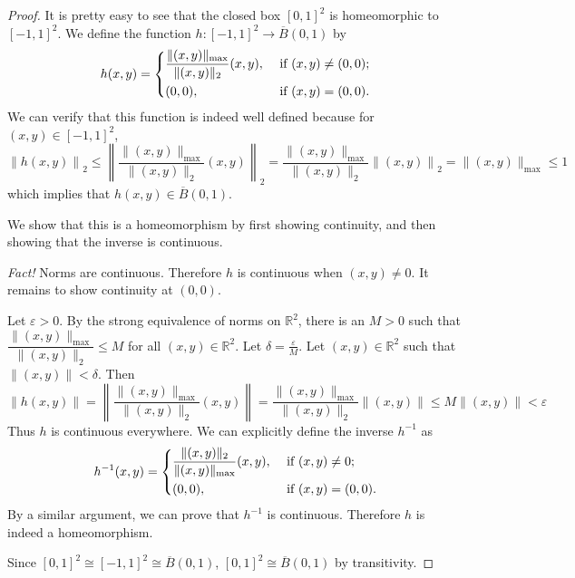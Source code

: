 \documentclass{article}
\newcommand{\cl}[1]{\overline{#1}}
\theoremstyle{plain} %
\numberwithin{thm}{section} %
\theoremstyle{definition}
\begin{document}
    \begin{proof}
        It is pretty easy to see that the closed box \([0,1]^2\) is homeomorphic to \([-1,1]^2\). We define the function \(h:[-1,1]^2 \to \cl{B}(0,1)\) by
        \[
            h(x,y)=\begin{dcases}
                \frac{\|(x,y)\| _{\max}}{\|(x,y)\| _2}(x, y), &\text{ if } (x,y) \neq (0,0) ;\\
                (0,0), &\text{ if } (x,y)=(0,0).
            \end{dcases}
        \]
        We can verify that this function is indeed well defined because for \((x,y) \in [-1,1]^2\),
        \[
            \left\lVert h(x,y) \right\rVert _2 \leq \left\lVert \frac{\|(x,y)\| _{\max}}{\|(x,y)\| _2}(x, y) \right\rVert _2 = \frac{\|(x,y)\| _{\max}}{\|(x,y)\| _2} \left\lVert (x,y) \right\rVert _2 = \|(x,y)\| _{\max} \leq 1
        \]
        which implies that \(h(x,y) \in \cl{B}(0,1)\).

        We show that this is a homeomorphism by first showing continuity, and then showing that the inverse is continuous.

        \textit{Fact!} Norms are continuous. Therefore \(h\) is continuous when \((x,y) \neq 0\). It remains to show continuity at \((0,0)\).

        Let \(\varepsilon > 0\). By the strong equivalence of norms on \(\mathbb{R}^2\), there is an \(M >0\) such that \(\dfrac{\|(x,y)\| _{\max}}{\|(x,y)\| _2} \leq M\) for all \((x,y) \in \mathbb{R}^2\). Let \(\delta = \frac{\varepsilon}{M}\). Let \((x,y) \in \mathbb{R}^2\) such that \(\|(x,y)\| < \delta\).
        Then
        \[
            \left\lVert h(x,y) \right\rVert = \left\lVert \frac{\|(x,y)\| _{\max}}{\|(x,y)\| _2}(x, y) \right\rVert = \frac{\|(x,y)\| _{\max}}{\|(x,y)\| _2} \left\lVert (x,y) \right\rVert \leq M \left\lVert (x,y) \right\rVert < \varepsilon
        \]
        Thus \(h\) is continuous everywhere. We can explicitly define the inverse \(h^{-1}\) as
        \[
            h^{-1} (x,y) = \begin{dcases}
                \frac{\|(x,y)\| _2}{\|(x,y)\| _{\max}} (x,y), &\text{ if } (x,y) \neq 0 ;\\
                (0,0), &\text{ if } (x,y) = (0,0).
            \end{dcases}
        \]
        By a similar argument, we can prove that \(h^{-1}\) is continuous. Therefore \(h\) is indeed a homeomorphism.

        Since \([0,1]^2 \cong [-1,1]^2 \cong \cl{B}(0,1)\), \([0,1]^2 \cong \cl{B}(0,1)\) by transitivity.
        
    \end{proof}
\end{document}
